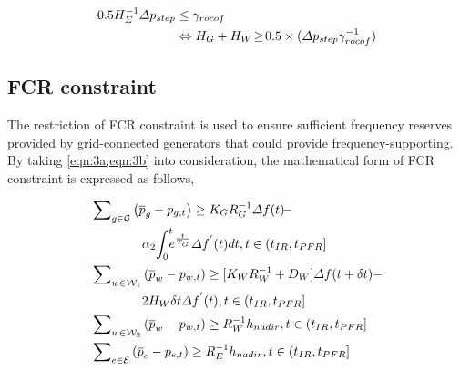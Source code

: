\documentclass[lettersize,journal]{IEEEtran}
\begin{document}
\vspace{-0.125in}
\begin{small}
	\begin{align}\label{eqn:10}
		0.5{H_{\varSigma}^{-1}}{\varDelta p_{{step}}} & \leq \gamma_{rocof}                                                                                   \\
		\quad\,\,\,                                   & \Leftrightarrow H_{G} + H_{W}\!\geq\! 0.5 \times ({\varDelta p_{{step} }} \gamma_{rocof}^{-1}) \notag
	\end{align}
\end{small}

\vspace{-0.15in}

\subsection{FCR constraint}

The restriction of FCR constraint is used to ensure sufficient frequency reserves provided by grid-connected generators that could provide frequency-supporting. By taking \cref{eqn:3a,eqn:3b} into consideration, the mathematical form of FCR constraint is expressed as follows,

\vspace{-0.125in}
\begin{newsubequations}
	\label{eqn:11}
	\begin{align}
		 & \sum\nolimits_{g\in\mathcal{G}} \left( \overline{p}_{g} -p_{g, t}\right) \geq{K_{G} }{ R_{G}^{-1}} \varDelta f(t) \!- \label{eqn:11a}            \\
		 & \qquad \qquad \alpha_2 \!\int_{0}^{t} \!\!\! e^{\frac{t}{T_G}} \!\!\ \varDelta f^{'}(t)dt,t \in (t_{IR}, t_{PFR}]\notag                          \\
		 & \sum\nolimits_{w\in\mathcal{W}_{1}} \left( \overline{p}_{w} - p_{w, t} \right) \geq [K_{W}R_{W}^{-1} + D_{W}]\varDelta f(t+\delta t) -  \notag   \\
		 & \qquad\qquad 2H_W \delta t \varDelta f^{'}(t), t \in (t_{IR}, t_{PFR}] \label{eqn:11b}                                                           \\
		 & \sum\nolimits_{w\in\mathcal{W}_{2}} \left( \overline{p}_{w} - p_{w, t} \right) \geq R_{W}^{-1} h_{nadir},t \in (t_{IR}, t_{PFR}] \label{eqn:11c} \\
		 & \sum\nolimits_{e\in\mathcal{E}} \left( \overline{p}_{e} -p_{e, t}\right)  \geq R_{E}^{-1} h_{nadir},t \in (t_{IR}, t_{PFR}] \label{eqn:11d}
	\end{align}\end{newsubequations}
\end{document}
